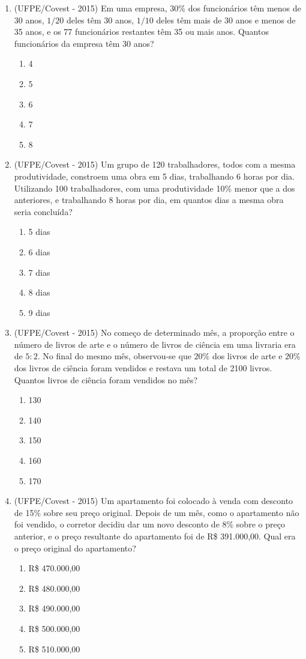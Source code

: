 \begin{enumerate}
 \item (UFPE/Covest - 2015) Em uma empresa, 30\% dos funcionários têm menos de 30 anos, $1/20$ deles têm 30 anos, $1/10$ deles têm mais de 30 anos e menos de 35 anos, e os 77 funcionários restantes têm 35 ou mais anos. Quantos funcionários da empresa têm 30 anos?
 \begin{enumerate}
 \item 4
 \item 5
 \item 6
 \item 7
 \item 8
 \end{enumerate}

 \item (UFPE/Covest - 2015) Um grupo de 120 trabalhadores, todos com a mesma produtividade, constroem uma obra em 5 dias, trabalhando 6 horas por dia. Utilizando 100 trabalhadores, com uma produtividade 10\% menor que a dos anteriores, e trabalhando 8 horas por dia, em quantos dias a mesma obra seria concluída?
 \begin{enumerate}
 \item 5 dias
 \item 6 dias
 \item 7 dias
 \item 8 dias
 \item 9 dias
 \end{enumerate}

 \item (UFPE/Covest - 2015) No começo de determinado mês, a proporção entre o número de livros de arte e o número de livros de ciência em uma livraria era de $5:2$. No final do mesmo mês, observou-se que $20\%$ dos livros de arte e $20\%$ dos livros de ciência foram vendidos e restava um total de 2100 livros. Quantos livros de ciência foram vendidos no mês?
 \begin{enumerate}
 \item 130
 \item 140
 \item 150
 \item 160
 \item 170
 \end{enumerate}

 \item (UFPE/Covest - 2015) Um apartamento foi colocado à venda com desconto de 15\% sobre seu preço original. Depois de um mês, como o apartamento não foi vendido, o corretor decidiu dar um novo desconto de 8\% sobre o preço anterior, e o preço resultante do apartamento foi de R\$ 391.000,00. Qual era o preço original do apartamento?
 \begin{enumerate}
 \item R\$ 470.000,00
 \item R\$ 480.000,00
 \item R\$ 490.000,00
 \item R\$ 500.000,00
 \item R\$ 510.000,00
 \end{enumerate}


\end{enumerate}
